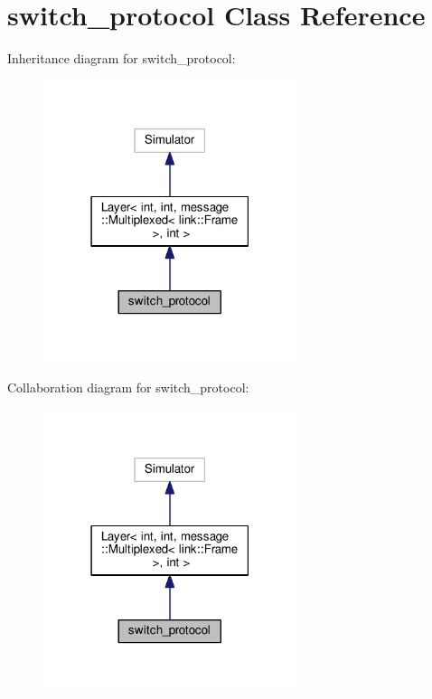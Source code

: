 \hypertarget{classswitch__protocol}{}\section{switch\+\_\+protocol Class Reference}
\label{classswitch__protocol}


Inheritance diagram for switch\+\_\+protocol\+:\nopagebreak
\begin{figure}[H]
\begin{center}
\leavevmode
\includegraphics[width=210pt]{classswitch__protocol__inherit__graph}
\end{center}
\end{figure}


Collaboration diagram for switch\+\_\+protocol\+:\nopagebreak
\begin{figure}[H]
\begin{center}
\leavevmode
\includegraphics[width=210pt]{classswitch__protocol__coll__graph}
\end{center}
\end{figure}
